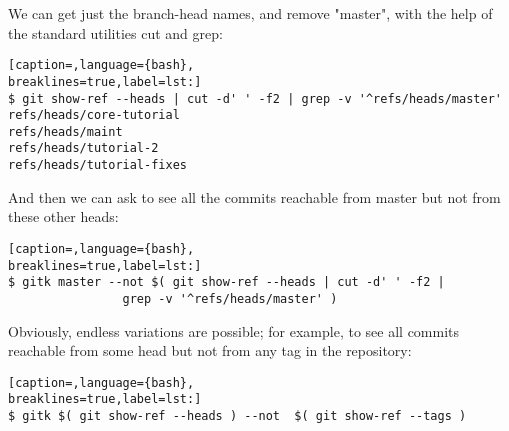 We can get just the branch-head names, and remove "master", with the help of
the standard utilities cut and grep:
\lstset{basicstyle=\scriptsize, numbers=none, captionpos=b, tabsize=4}
\begin{lstlisting}[caption=,language={bash},
breaklines=true,label=lst:]
$ git show-ref --heads | cut -d' ' -f2 | grep -v '^refs/heads/master'
refs/heads/core-tutorial
refs/heads/maint
refs/heads/tutorial-2
refs/heads/tutorial-fixes
\end{lstlisting}

And then we can ask to see all the commits reachable from master but not from
these other heads:
\lstset{basicstyle=\scriptsize, numbers=none, captionpos=b, tabsize=4}
\begin{lstlisting}[caption=,language={bash},
breaklines=true,label=lst:]
$ gitk master --not $( git show-ref --heads | cut -d' ' -f2 |
                grep -v '^refs/heads/master' )
\end{lstlisting}

Obviously, endless variations are possible; for example, to see all commits
reachable from some head but not from any tag in the repository:
\lstset{basicstyle=\scriptsize, numbers=none, captionpos=b, tabsize=4}
\begin{lstlisting}[caption=,language={bash},
breaklines=true,label=lst:]
$ gitk $( git show-ref --heads ) --not  $( git show-ref --tags )
\end{lstlisting}
